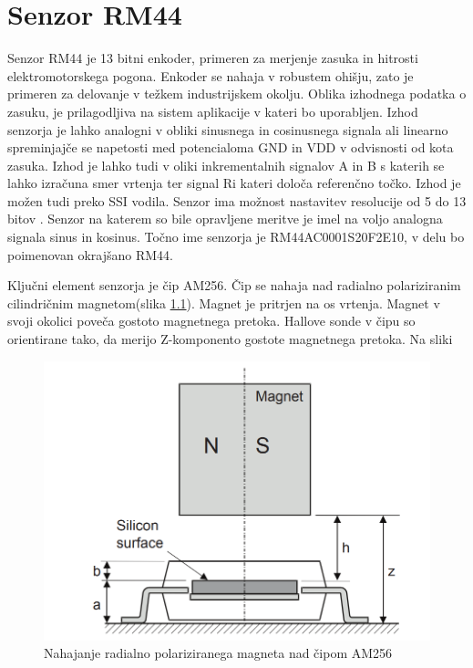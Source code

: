 \chapter{Senzor RM44}

Senzor RM44 je 13 bitni enkoder, primeren za merjenje zasuka in hitrosti elektromotorskega pogona\cite{RM44}.
Enkoder se nahaja v robustem ohišju, zato je primeren za delovanje v težkem industrijskem okolju. %
Oblika izhodnega podatka o zasuku, je prilagodljiva na sistem aplikacije v kateri bo uporabljen\cite{Ambrozic}. Izhod senzorja je lahko analogni v obliki sinusnega in cosinusnega signala ali linearno spreminjajče se napetosti med potencialoma GND in VDD v odvisnosti od kota zasuka.
Izhod je lahko tudi v oliki inkrementalnih signalov A in B s katerih se lahko izračuna smer vrtenja ter signal Ri kateri določa referenčno točko. Izhod je možen tudi preko SSI vodila. Senzor ima možnost nastavitev resolucije od 5 do 13 bitov \cite{AM8192}\cite{RM44}. Senzor na katerem so bile opravljene meritve je imel na voljo analogna signala sinus in kosinus. Točno ime senzorja je RM44AC0001S20F2E10, v delu bo poimenovan okrajšano RM44.

Ključni element senzorja je čip AM256. Čip se nahaja nad radialno polariziranim cilindričnim magnetom(slika \ref{stranski_ris}). Magnet je pritrjen na os vrtenja. Magnet v svoji okolici poveča gostoto magnetnega pretoka. Hallove sonde v čipu so orientirane tako, da merijo Z-komponento gostote magnetnega pretoka. Na sliki 
\begin{figure}[h]
	\centering
	\includegraphics[width=0.8\columnwidth]{./Slike/stranski_ris.png}
	\caption{Nahajanje radialno polariziranega magneta nad čipom AM256}
	\label{stranski_ris}
\end{figure}



